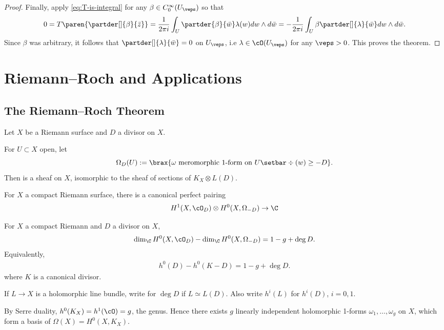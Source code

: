 \documentclass[11pt]{report}
\begin{document}
\begin{proof}
Finally, apply \eqref{eq:T-is-integral} for any $\beta \in C_0^\infty (U_\veps)$ so that
\[
0 = T\paren{\partder[]{\beta}{\bar z}}=\frac{1}{2\pi i }\int_U \partder{\beta}{\bar w}\lambda (w)dw \land d\bar w = -\frac{1}{2\pi i }\int_U \beta \partder[]{\lambda}{\bar w} dw \land d \bar w.
\]
Since $\beta$ was arbitrary, it follows that $\partder[]{\lambda}{\bar w}=0$ on $U_\veps$, i.e $\lambda \in \cO(U_\veps)$ for any $\veps>0$. This proves the theorem.
\end{proof}

\chapter{Riemann--Roch and Applications}

\section{The Riemann--Roch Theorem}
Let $X$ be a Riemann surface and $D$ a divisor on $X$.

\begin{defn}
For $U \subset X$ open, let
\[
\Omega_D(U):= \brax{\omega \text{ meromorphic 1-form on } U \setbar \div (w) \geq -D}.
\]
Then  is a sheaf on $X$, isomorphic to the sheaf of sections of $K_X \otimes L(D)$.
\end{defn}

\begin{thm} \label{thm:serre-duality}
For $X$ a compact Riemann surface, there is a canonical perfect pairing
\[
H^1(X,\cO_D)\otimes H^0(X,\Omega_{-D}) \to \C
\]
\end{thm}

\begin{thm} \label{thm:strong-riemann-roch}
For $X$ a compact Riemann and $D$ a divisor on $X$,
\[
\dim_\C H^0(X,\cO_D)-\dim_\C H^0(X,\Omega_{-D}) = 1-g+\deg D.
\]
Equivalently,
\begin{align*}
h^0(D)-h^0(K-D)=1-g+\deg D.
\end{align*}
where $K$ is a canonical divisor.
\end{thm}

\begin{defn}
If $L \to X$ is a holomorphic line bundle, write  for $\deg D$ if $L \simeq L(D)$. Also write $h^i(L)$ for $h^i(D)$, $i=0,1$.
\end{defn}

\begin{cor}
By Serre duality, $h^0(K_X)=h^1(\cO)=g$, the genus. Hence there exists $g$ linearly independent holomorphic 1-forms $\omega_1,\dots,\omega_g$ on $X$, which form a basis of $\Omega(X)=H^0(X,K_X)$.
\end{cor}
\end{document}
